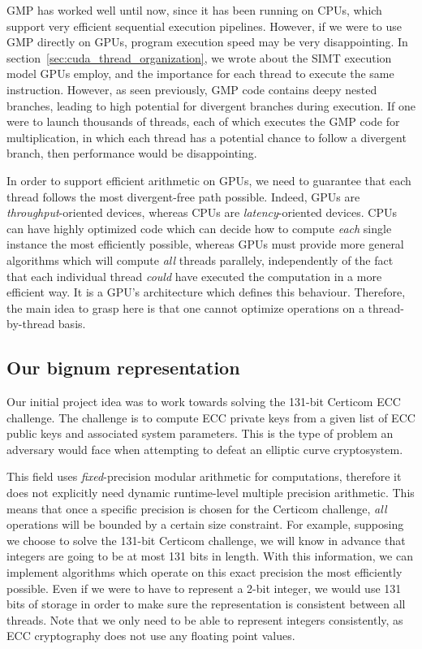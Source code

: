 \documentclass[10pt, a4paper]{report}
\begin{document}
GMP has worked well until now, since it has been running on CPUs, which support
very efficient sequential execution pipelines.
However, if we were to use GMP directly on GPUs, program execution speed may be
very disappointing.
In section~\ref{sec:cuda_thread_organization}, we wrote about the SIMT execution
model GPUs employ, and the importance for each thread to execute the same
instruction.
However, as seen previously, GMP code contains deepy nested branches, leading to
high potential for divergent branches during execution.
If one were to launch thousands of threads, each of which executes the GMP code
for multiplication, in which each thread has a potential chance to follow a
divergent branch, then performance would be disappointing.

In order to support efficient arithmetic on GPUs, we need to guarantee that each
thread follows the most divergent-free path possible.
Indeed, GPUs are \emph{throughput}-oriented devices, whereas CPUs are
\emph{latency}-oriented devices.
CPUs can have highly optimized code which can decide how to compute \emph{each}
single instance the most efficiently possible, whereas GPUs must provide more
general algorithms which will compute \emph{all} threads parallely,
independently of the fact that each individual thread \emph{could} have executed
the computation in a more efficient way.
It is a GPU's architecture which defines this behaviour.
Therefore, the main idea to grasp here is that one cannot optimize operations on
a thread-by-thread basis.

\subsection{Our bignum representation}
Our initial project idea was to work towards solving the 131-bit Certicom ECC
challenge.
The challenge is to compute ECC private keys from a given list of ECC public
keys and associated system parameters. This is the type of problem an adversary
would face when attempting to defeat an elliptic curve cryptosystem.

This field uses \emph{fixed}-precision modular arithmetic for computations,
therefore it does not explicitly need dynamic runtime-level multiple precision
arithmetic.
This means that once a specific precision is chosen for the Certicom challenge,
\emph{all} operations will be bounded by a certain size constraint.
For example, supposing we choose to solve the 131-bit Certicom challenge, we
will know in advance that integers are going to be at most 131 bits in length.
With this information, we can implement algorithms which operate on this exact
precision the most efficiently possible.
Even if we were to have to represent a 2-bit integer, we would use 131 bits of
storage in order to make sure the representation is consistent between all
threads.
Note that we only need to be able to represent integers consistently, as
ECC cryptography does not use any floating point values.
\end{document}
